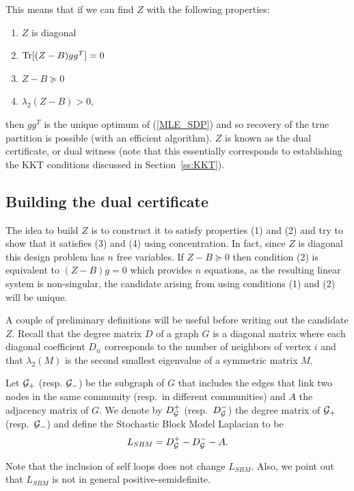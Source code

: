 This means that if we can find $Z$ with the following properties:
\begin{enumerate}[leftmargin=10mm,itemsep=0.2pt,topsep=2pt]
\item[(1)] $Z$ is diagonal
\item[(2)] $\operatorname{Tr}[(Z-B)gg^T] = 0$
\item[(3)] $Z-B \succeq 0$
\item[(4)] $\lambda_2(Z-B)> 0$,
\end{enumerate}
 then $gg^T$ is the unique optimum of (\ref{MLE_SDP}) and so recovery of the true partition is possible (with an efficient algorithm).
 $Z$ is known as the dual certificate, or dual witness (note that this essentially corresponds to establishing the KKT conditions discussed in Section~\ref{ss:KKT}).









 \subsection{Building the dual certificate}

The idea to build $Z$ is to construct it to satisfy properties (1) and (2) and try to show that it satisfies (3) and (4) using concentration. In fact, since $Z$ is diagonal this design problem has $n$ free variables. If $Z-B \succeq 0$ then condition (2) is equivalent to $(Z-B)g=0$ which provides $n$ equations, as the resulting linear system is non-singular, the candidate arising from using conditions (1) and (2) will be unique.
 
 A couple of preliminary definitions will be useful before writing out the candidate $Z$. Recall that the degree matrix $D$ of a graph $G$ is a diagonal matrix where each diagonal coefficient $D_{ii}$ corresponds to the number of neighbors of vertex $i$ and that $\lambda_2(M)$ is the second smallest eigenvalue of a symmetric matrix $M$.
\begin{definition}\label{Def:L_SBM}
Let $\mathcal{G}_+$ (resp. $\mathcal{G}_-$) be the subgraph of $G$ that includes the edges that link two nodes in the same community (resp.\ in different communities) and $A$ the adjacency matrix of $G$. We denote by $D_{\mathcal{G}}^+$ (resp.\ $D_{\mathcal{G}}^-$) the degree matrix of $\mathcal{G}_+$ (resp.\ $\mathcal{G}_-$) and define the Stochastic Block Model Laplacian to be
\begin{eqnarray*}
L_{SBM}= D_{\mathcal{G}}^+-D_{\mathcal{G}}^--A.
\end{eqnarray*}
\end{definition}
Note that the inclusion of  self loops does not change $L_{SBM}$. Also, we point out that $L_{SBM}$ is not in general positive-semidefinite.

